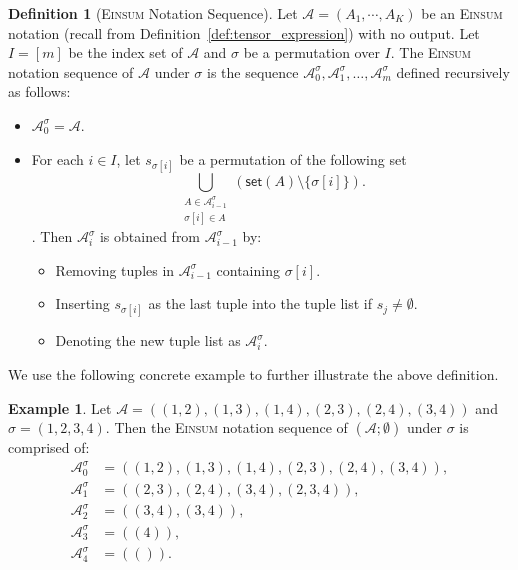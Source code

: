 \documentclass[sn-mathphys, natbib=false]{sn-jnl}
\theoremstyle{plain}
\theoremstyle{definition}
\newtheorem{definition}{Definition}
\newtheorem{example}{Example}
\def\Einsum{\textsc{Einsum}}
\newcommand{\takesetp}[1]{\mathsf{set}(#1)}
\newcommand{\taketuplep}[1]{\mathsf{tuple}\left( #1 \right)}
\def\calA{\mathcal{A}}
\begin{document}
\begin{bibunit}[agsm]
\begin{definition}[\Einsum{} Notation Sequence]
\label{def:einsum_sequence}
Let $\calA = (A_1, \cdots, A_K)$ be an \Einsum{} notation (recall from Definition~\ref{def:tensor_expression}) with no output. Let $I = [m]$ be the index set of $\calA$ and $\sigma$ be a permutation over $I$. The \Einsum{} notation sequence of $\calA$ under $\sigma$ is the sequence $\calA^{\sigma}_0, \calA^{\sigma}_1, \ldots, \calA^{\sigma}_m$ defined recursively as follows:
\begin{itemize}
\item $\calA^{\sigma}_0 = \calA$.
\item For each $i \in I$, let $s_{\sigma[i]}$ be a permutation of the following set 
\begin{equation*}
    \bigcup_{\substack{ A \in \calA^{\sigma}_{i-1} \\ \sigma[i] \in A}} (\takesetp{A} \setminus \{\sigma[i]\}).
\end{equation*}. 
Then $\calA^{\sigma}_i$ is obtained from $\calA^{\sigma}_{i-1}$ by:
\begin{itemize}
\item Removing tuples in $\calA_{i - 1}^{\sigma}$ containing $\sigma[i]$.
\item Inserting $s_{\sigma[i]}$ as the last tuple into the tuple list if $s_j \ne \emptyset$.
\item Denoting the new tuple list as $\calA^{\sigma}_{i}$.
\end{itemize}
\end{itemize}
\end{definition}

We use the following concrete example to further illustrate the above definition. 

\begin{example}
Let $\calA = ((1,2), (1,3), (1,4), (2,3), (2,4), (3,4))$ and $\sigma = (1,2,3,4)$. Then the \Einsum{} notation sequence of $(\calA; \emptyset)$ under $\sigma$ is comprised of:
\begin{align*}
\calA^{\sigma}_{0} & = ((1,2), (1,3), (1,4), (2,3), (2,4), (3,4)), \\
\calA^{\sigma}_{1} & = ((2,3), (2,4), (3,4),(2,3,4)), \\
\calA^{\sigma}_{2} & = ((3,4), (3,4)), \\
\calA^{\sigma}_{3} & = ((4)), \\
\calA^{\sigma}_{4} & = (()).
\end{align*}
\end{example}


\end{bibunit}
\end{document}
